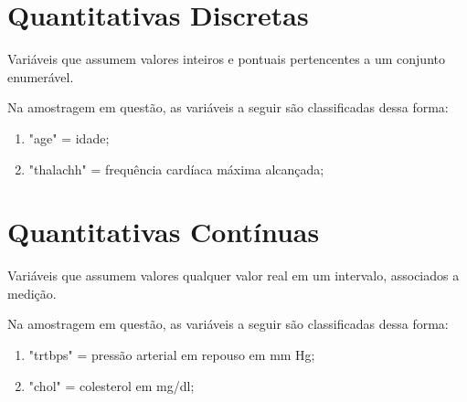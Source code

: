     \section{Quantitativas Discretas}

    Variáveis que assumem valores inteiros e pontuais pertencentes a um conjunto enumerável. 

    Na amostragem em questão, as variáveis a seguir são classificadas dessa forma: 

    \begin{enumerate}[label={\alph*)}]
        \addtolength{\itemindent}{1.25cm}
        \item "age" = idade;
        \item "thalachh" = frequência cardíaca máxima alcançada;
    \end{enumerate}

    \section{Quantitativas Contínuas}

    Variáveis que assumem valores qualquer valor real em um intervalo, associados a medição. 

    Na amostragem em questão, as variáveis a seguir são classificadas dessa forma: 

    \begin{enumerate}[label={\alph*)}]
        \addtolength{\itemindent}{1.25cm}
        \item "trtbps" = pressão arterial em repouso em mm Hg;
        \item "chol" = colesterol em mg/dl;
    \end{enumerate}

    \nocite{classificacao}